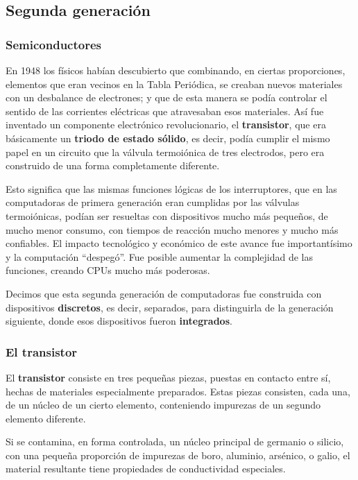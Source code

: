 \documentclass[spanish,A4,]{article}
\begin{document}
\subsection{Segunda generación}\label{segunda-generaciuxf3n}

\subsubsection{Semiconductores}\label{semiconductores}

En 1948 los físicos habían descubierto que combinando, en ciertas
proporciones, elementos que eran vecinos en la Tabla Periódica, se
creaban nuevos materiales con un desbalance de electrones; y que de esta
manera se podía controlar el sentido de las corrientes eléctricas que
atravesaban esos materiales. Así fue inventado un componente electrónico
revolucionario, el \textbf{transistor}, que era básicamente un
\textbf{triodo de estado sólido}, es decir, podía cumplir el mismo papel
en un circuito que la válvula termoiónica de tres electrodos, pero era
construido de una forma completamente diferente.

Esto significa que las mismas funciones lógicas de los interruptores,
que en las computadoras de primera generación eran cumplidas por las
válvulas termoiónicas, podían ser resueltas con dispositivos mucho más
pequeños, de mucho menor consumo, con tiempos de reacción mucho menores
y mucho más confiables. El impacto tecnológico y económico de este
avance fue importantísimo y la computación ``despegó''. Fue posible
aumentar la complejidad de las funciones, creando CPUs mucho más
poderosas.

Decimos que esta segunda generación de computadoras fue construida con
dispositivos \textbf{discretos}, es decir, separados, para distinguirla
de la generación siguiente, donde esos dispositivos fueron
\textbf{integrados}.

\subsubsection{El transistor}\label{el-transistor}

El \textbf{transistor} consiste en tres pequeñas piezas, puestas en
contacto entre sí, hechas de materiales especialmente preparados. Estas
piezas consisten, cada una, de un núcleo de un cierto elemento,
conteniendo impurezas de un segundo elemento diferente.

Si se contamina, en forma controlada, un núcleo principal de germanio o
silicio, con una pequeña proporción de impurezas de boro, aluminio,
arsénico, o galio, el material resultante tiene propiedades de
conductividad especiales.
\end{document}
